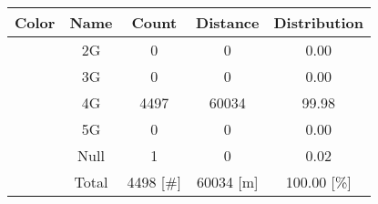 \begin{tabular}{|c|c|c|c|c|}\hline
\rowcolor{Plum!20}
Color&Name&Count&Distance&Distribution\\\hline\hline
\cellcolor[HTML]{00ffff} &2G&0&0&0.00\\\hline
\cellcolor[HTML]{ff00e6} &3G&0&0&0.00\\\hline
\cellcolor[HTML]{0008ff} &4G&4497&60034&99.98\\\hline
\cellcolor[HTML]{32cd32} &5G&0&0&0.00\\\hline
\cellcolor[HTML]{000000} &Null&1&0&0.02\\\hline
\cellcolor[HTML]{ffffff} &Total&4498 [\#]&60034 [m]&100.00 [\%]\\\hline
\end{tabular}
